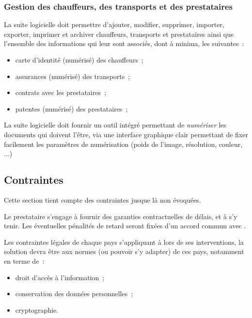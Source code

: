 \subsubsection{Gestion des chauffeurs, des transports et des prestataires}
La suite logicielle doit permettre d'ajouter, modifier, supprimer, importer, exporter, imprimer et archiver chauffeurs, transports et prestataires ainsi que l'ensemble des informations qui leur sont associés, dont à minima, les suivantes~:
\begin{itemize}
	\item carte d'identité (numérisé) des chauffeurs~;
	\item assurances (numérisé) des transports~;
	\item contrats avec les prestataires~;
	\item patentes (numérisé) des prestataires~;
\end{itemize}
\begin{constraint}
La suite logicielle doit fournir un outil intégré permettant de \emph{numériser} les documents qui doivent l'être, via une interface graphique clair permettant de fixer facilement les paramètres de numérisation (poids de l'image, résolution, couleur, ...)
\end{constraint}

\subsection{Contraintes}
Cette section tient compte des contraintes jusque là non évoquées.

\begin{constraint}
Le prestataire s'engage à fournir des garanties contractuelles de délais, et à s'y tenir. Les éventuelles pénalités de retard seront fixées d'un accord commun avec \mo.
\end{constraint}

\begin{constraint}
Les contraintes légales de chaque pays s'appliquant à \mo lors de ses interventions, la solution devra être aux normes (ou pouvoir s'y adapter) de ces pays, notamment en terme de~:
\begin{itemize}
	\item droit d'accès à l'information~;
	\item conservation des données personnelles~;
	\item cryptographie.
\end{itemize}
\end{constraint}

